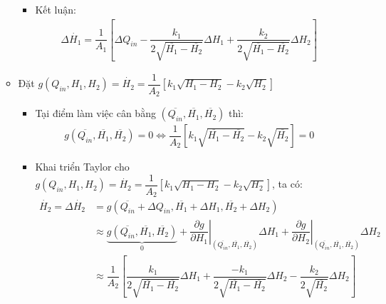 \begin{enumerate}[\it a.]
\begin{itemize}
\begin{itemize}
                            \item Kết luận:
                                \begin{align}
                                    \Delta \dot{H_1} = \dfrac{1}{A_1} \left[{\Delta Q_{in} - \dfrac{k_1}{2\sqrt{\overline{H_1} - \overline{H_2}}} \Delta H_1 + \dfrac{k_2}{2\sqrt{\overline{H_1} - \overline{H_2}}} \Delta H_2}\right]
                                \end{align}
                        \end{itemize}

                    \item Đặt $g\left({Q_{in}, H_1, H_2}\right) = \dot{H_2} = \dfrac{1}{A_2} \left[{k_1 \sqrt{H_1 - H_2} - k_2 \sqrt{H_2}}\right]$
                        \begin{itemize}
                            \item Tại điểm làm việc cân bằng $\left({\overline{Q_{in}}, \overline{H_1}, \overline{H_2}}\right)$ thì:
                                \begin{align}
                                    g\left({\overline{Q_{in}}, \overline{H_1}, \overline{H_2}}\right) = 0 \Longleftrightarrow \dfrac{1}{A_2} \left[{k_1\sqrt{\overline{H_1} - \overline{H_2}} - k_2 \sqrt{\overline{H_2}}}\right] = 0
                                \end{align}

                            \item Khai triển Taylor cho $g\left({Q_{in}, H_1, H_2}\right) = \dot{H_2} = \dfrac{1}{A_2} \left[{k_1 \sqrt{H_1 - H_2} - k_2 \sqrt{H_2}}\right]$, ta có:
                                \begin{align}
                                    \dot{H_2} = \Delta \dot{H_2} & = g\left({\overline{Q_{in}} + \Delta Q_{in}, \overline{H_1} + \Delta H_1, \overline{H_2} + \Delta H_2}\right) \\
                                    & \approx \underbrace{g\left({\overline{Q_{in}}, \overline{H_1}, \overline{H_2}}\right)}_{0} + \left.\dfrac{\partial g}{\partial H_1}\right|_{\left({\overline{Q_{in}}, \overline{H_1}, \overline{H_2}}\right)} \Delta H_1 + \left.\dfrac{\partial g}{\partial H_2}\right|_{\left({\overline{Q_{in}}, \overline{H_1}, \overline{H_2}}\right)} \Delta H_2\\
                                    & \approx \dfrac{1}{A_2} \left[{\dfrac{k_1}{2 \sqrt{\overline{H_1} - \overline{H_2}}} \Delta H_1 + \dfrac{-k_1}{2 \sqrt{\overline{H_1} - \overline{H_2}}} \Delta H_2 - \dfrac{k_2}{2 \sqrt{\overline{H_2}}} \Delta H_2}\right]
                                \end{align}


\end{itemize}
\end{itemize}
\end{enumerate}
